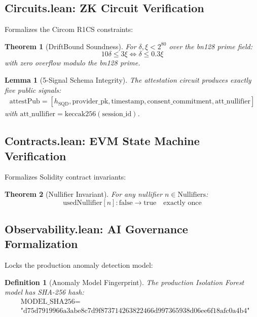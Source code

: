 \documentclass[11pt,a4paper]{article}
\newtheorem{theorem}{Theorem}
\newtheorem{lemma}{Lemma}
\newtheorem{definition}{Definition}
\theoremstyle{plain}
\begin{document}
\subsection{Circuits.lean: ZK Circuit Verification}

Formalizes the Circom R1CS constraints:

\begin{theorem}[DriftBound Soundness]
For $\delta, \xi < 2^{80}$ over the bn128 prime field:
\begin{equation}
    10\delta \leq 3\xi \iff \delta \leq 0.3\xi
\end{equation}
with zero overflow modulo the bn128 prime.
\end{theorem}

\begin{lemma}[5-Signal Schema Integrity]
The attestation circuit produces exactly five public signals:
\begin{align}
    \text{attestPub} = [h_{\text{SQD}}, \text{provider\_pk}, \text{timestamp}, \text{consent\_commitment}, \text{att\_nullifier}]
\end{align}
with $\text{att\_nullifier} = \text{keccak256}(\text{session\_id})$.
\end{lemma}

\subsection{Contracts.lean: EVM State Machine Verification}

Formalizes Solidity contract invariants:

\begin{theorem}[Nullifier Invariant]
For any nullifier $n \in \text{Nullifiers}$:
\begin{equation}
    \text{usedNullifier}[n] : \text{false} \rightarrow \text{true} \quad \text{exactly once}
\end{equation}
\end{theorem}

\subsection{Observability.lean: AI Governance Formalization}

Locks the production anomaly detection model:

\begin{definition}[Anomaly Model Fingerprint]
The production Isolation Forest model has SHA-256 hash:
\begin{align}
    &\text{MODEL\_SHA256} = \\
    &\text{"d75d7919966a3abe8c7d9f873714263822466d997365938d06ee6f18afc0a4b4"}
\end{align}
\end{definition}
\end{document}
